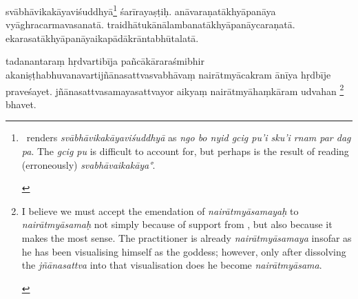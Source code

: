 \documentclass[naipra.tex]{subfiles}
\begin{document}
\begin{sanskrit}
svābhāvikakāyaviśuddhyā\footnote{
	\begin{english}%
		\TIB\ renders \emph{svābhāvikakāyaviśuddhyā} as \emph{ngo bo nyid gcig pu'i sku'i rnam par dag pa}. 
		The \emph{gcig pu} is difficult to account for, but perhaps is the result of reading (erroneously) \emph{svabhāvaikakāya°}.
	\end{english}
} śarīrayaṣṭiḥ.
anāvaraṇatākhyāpanāya vyāghracarmavasanatā.
traidhātukānālambanatākhyāpanāy\crux {}\crux caraṇatā.
ekarasatākhyāpanāyaikapādākrāntabhūtalatā.
\pend


\pstart
tadanantaraṃ hṛdvartibīja pañcākāraraśmibhir akaniṣṭhabhuvanavartijñānasattvasvabhāvaṃ nairātmyācakram ānīya hṛdbīje praveśayet.
jñānasattvasamayasattvayor aikyaṃ  nairātmyāhaṃkāram udvahan \footnote{
	\begin{english}%
		I believe we must accept the emendation of \emph{nairātmyāsamayaḥ} to \emph{nairātmyāsamaḥ} not simply because of support from \TIB , but also because it makes the most sense.
		The practitioner is already \emph{nairātmyāsamaya} insofar as he has been visualising himself as the goddess; however, only after dissolving the \emph{jñānasattva} into that visualisation does he become \emph{nairātmyāsama}.
	\end{english}
} bhavet. 
\pend


\end{sanskrit}
\end{document}
